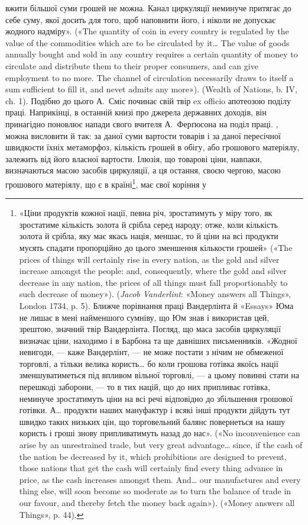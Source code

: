 {вжити більшої суми грошей не можна. Канал циркуляції
неминуче притягає до себе суму, якої досить для того, щоб наповнити
його, і ніколи не допускає жодного надміру». («The quantity of coin in
every country is regulated by the value of the commodities which are to
be circulated by it\dots{} The value of goods annually bought and sold in any
country requires a certain quantity of money to circulate and distribute
them to their proper consumers, and can give employment to no more. The
channel of circulation necessarily draws to itself a sum sufficient to fill
it, and nevet admits any more»). (Wealth of Nations, b. IV, ch. 1). Подібно
до цього А.~Сміс починає свій твір ex officio апотеозою поділу праці. Наприкінці,
в останній книзі про джерела державних доходів, він принагідно
поновлює напади свого вчителя А.~Ферґюсона на поділ праці.
}, можна висловити й так: за даної суми вартости
товарів і за даної пересічної швидкости їхніх метаморфоз,
кількість грошей в обігу, або грошового матеріялу, залежить від
його власної вартости. Ілюзія, що товарові ціни, навпаки, визначаються
масою засобів циркуляції, а ця остання, своєю чергою,
масою грошового матеріялу, що є в країні\footnote{
«Ціни продуктів кожної нації, певна річ, зростатимуть у міру
того, як зростатиме кількість золота й срібла серед народу; отже, коли
кількість золота й срібла, яку має якась нація, меншає, то й ціни на всі
продукти мусять спадати пропорційно до цього зменшення кількости грошей»
(«The prices of things will certainly rise in every nation, as the gold
and silver increase amongst the people: and, consequently, where the gold
and silver decrease in any nation, the prices of all things must fall proportionably
to such decrease of money»). (\emph{Jacob Vanderlint}: «Money answers
all Things», London 1734, p. 5). Ближче порівнання праці Вандерлінта
й «Essays» Юма не лишає в мені найменшого сумніву, що Юм
знав і використав цей, зрештою, значний твір Вандерлінта. Погляд, що
маса засобів циркуляції визначає ціни, находимо і в Барбона та ще давніших
письменників. «Жодної невигоди, — каже Вандерлінт, — не може
постати з нічим не обмеженої торговлі, а тільки велика користь\dots{} бо коли
грошова готівка якоїсь нації зменшуватиметься під впливом вільної
торговлі, — а цьому повинні стати на перешкоді заборони, — то в тих націй,
що до них припливає готівка, неминуче зростатимуть ціни на всі
речі відповідно до збільшення грошової готівки. А\dots{} продукти наших мануфактур
і всякі інші продукти дійдуть тут швидко таких низьких цін,
що торговельний балянс повернеться на нашу користь і гроші знову припливатимуть
назад до нас». («No inconvenience can arise by an unrestrained
trade, but very great advantage\dots{} since, if the cash of the nation be decreased
by it, which prohibitions are designed to prevent, those nations that
get the cash will certainly find every thing advance in price, as the cash
increases amongst them. And\dots{} our manufactures and every thing else, will
soon become so moderate as to turn the balance of trade in our favour, and thereby
fetch the money back again»). («Money answers all Things», p. 44).
}, має свої коріння у
\parbreak{}  %
